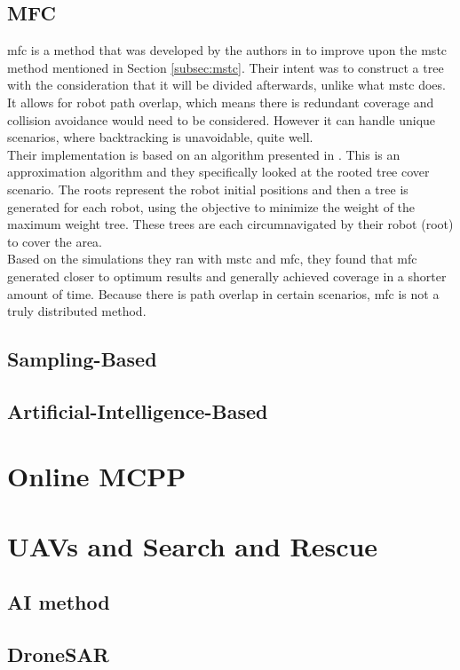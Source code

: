 \subsection{MFC}
\ac{mfc} is a method that was developed by the authors in \cite{Zheng2005} to improve upon the \ac{mstc} method mentioned in Section \ref{subsec:mstc}. Their intent was to construct a tree with the consideration that it will be divided afterwards, unlike what \ac{mstc} does. It allows for robot path overlap, which means there is redundant coverage and collision avoidance would need to be considered. However it can handle unique scenarios, where backtracking is unavoidable, quite well.\\ 
Their implementation is based on an algorithm presented in \cite{Even2003}. This is an approximation algorithm and they specifically looked at the rooted tree cover scenario. The roots represent the robot initial positions and then a tree is generated for each robot, using the objective to minimize the weight of the maximum weight tree. These trees are each circumnavigated by their robot (root) to cover the area.\\
Based on the simulations they ran with \ac{mstc} and \ac{mfc}, they found that \ac{mfc} generated closer to optimum results and generally achieved coverage in a shorter amount of time.	Because there is path overlap in certain scenarios, \ac{mfc} is not a truly distributed method.
\subsection{Sampling-Based}
\subsection{Artificial-Intelligence-Based}

\section{Online MCPP}
\label{sec:lit Online MCPP}
\section{UAVs and Search and Rescue}
\subsection{AI method}
\subsection{DroneSAR}


